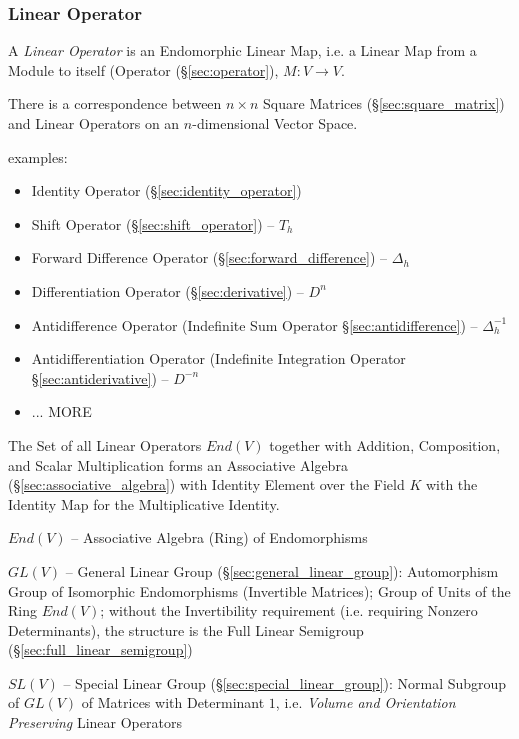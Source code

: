 \subsubsection{Linear Operator}\label{sec:linear_operator}

A \emph{Linear Operator} is an Endomorphic Linear Map, i.e. a Linear Map from a
Module to itself (Operator (\S\ref{sec:operator}), $M : V \rightarrow V$.

There is a correspondence between $n\times{n}$ Square Matrices
(\S\ref{sec:square_matrix}) and Linear Operators on an $n$-dimensional Vector
Space.

examples:
\begin{itemize}
  \item Identity Operator (\S\ref{sec:identity_operator})
  \item Shift Operator (\S\ref{sec:shift_operator}) -- $T_h$
  \item Forward Difference Operator (\S\ref{sec:forward_difference}) --
    $\Delta_h$
  \item Differentiation Operator (\S\ref{sec:derivative}) -- $D^n$
  \item Antidifference Operator (Indefinite Sum Operator
    \S\ref{sec:antidifference}) -- $\Delta^{-1}_h$
  \item Antidifferentiation Operator (Indefinite Integration Operator
    \S\ref{sec:antiderivative}) -- $D^{-n}$
  \item ... MORE
\end{itemize}

The Set of all Linear Operators $End(V)$ together with Addition, Composition,
and Scalar Multiplication forms an Associative Algebra
(\S\ref{sec:associative_algebra}) with Identity Element over the Field $K$ with
the Identity Map for the Multiplicative Identity.

$End(V)$ -- Associative Algebra (Ring) of Endomorphisms

$GL(V)$ -- General Linear Group (\S\ref{sec:general_linear_group}):
Automorphism Group of Isomorphic Endomorphisms (Invertible Matrices); Group of
Units of the Ring $End(V)$; without the Invertibility requirement (i.e.
requiring Nonzero Determinants), the structure is the Full Linear Semigroup
(\S\ref{sec:full_linear_semigroup})

$SL(V)$ -- Special Linear Group (\S\ref{sec:special_linear_group}): Normal
Subgroup of $GL(V)$ of Matrices with Determinant $1$, i.e. \emph{Volume and
  Orientation Preserving} Linear Operators

